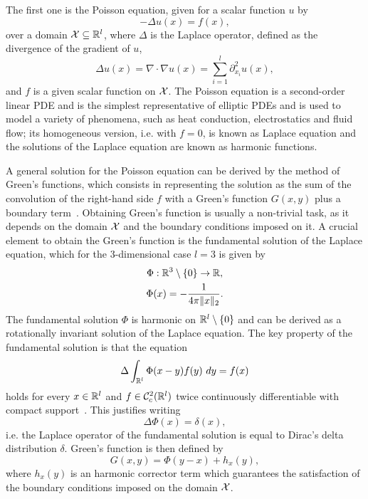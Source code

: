The first one is the Poisson equation, given for a scalar function $u$ by 
\begin{equation}\label{eq:Poisson}
    -\Delta u(x) = f(x), 
\end{equation}
over a domain $\mathcal X \subseteq \mathbb{R}^l$, where $\Delta$ is the Laplace operator, defined as the divergence of the gradient of $u$, 
\[
    \Delta u(x) = \nabla \cdot \nabla u(x) = \sum_{i=1}^{l} \partial^2_{x_i} u(x), 
\] and $f$ is a given scalar function on $\mathcal X$.
The Poisson equation is a second-order linear PDE and is the simplest representative of elliptic PDEs and is used to model a variety of phenomena, such as heat conduction, electrostatics and fluid flow; its homogeneous version, i.e. with $f=0$, is known as Laplace equation and the solutions of the Laplace equation are known as harmonic functions.

A general solution for the Poisson equation can be derived by the method of Green's functions, which consists in representing the solution as the sum of the convolution of the right-hand side $f$ with a Green's function $G(x,y)$ plus a boundary term~\cite[Chapter 2.2, Theorem 12]{Evans2010}.
Obtaining Green's function is usually a non-trivial task, as it depends on the domain $\mathcal X$ and the boundary conditions imposed on it.
A crucial element to obtain the Green's function is the fundamental solution of the Laplace equation, which for the 3-dimensional case $l=3$ is given by
\begin{equation}\label{eq:Poisson-fundamental-solution}
    \begin{gathered}
        \Phi : \mathbb{R}^3 \setminus \{0\} \rightarrow \mathbb{R}, \\
        \Phi(x) =  -\frac{1}{4\pi \|x \|_2}.
    \end{gathered}
\end{equation}
The fundamental solution $\Phi$ is harmonic on $\mathbb{R}^l\setminus \{0\}$ and can be derived as a rotationally invariant solution of the Laplace equation.
The key property of the fundamental solution is that the equation 
\[ 
    \Delta \int_{\mathbb{R}^l} \Phi(x-y) f(y) \ dy = f(x) 
\]
holds for every $x \in \mathbb{R}^l$ and $f \in \mathcal C^2_c(\mathbb{R}^l)$ twice continuously differentiable with compact support~\cite[Theorem 1]{Evans2010}.
This justifies writing \[
    \Delta \Phi(x) = \delta(x),
\]
i.e. the Laplace operator of the fundamental solution is equal to Dirac's delta distribution $\delta$.
Green's function is then defined by 
\[
    G(x,y) = \Phi(y-x) + h_x(y),
\]
where $h_x(y)$ is an harmonic corrector term which guarantees the satisfaction of the boundary conditions imposed on the domain $\mathcal X$. \medskip

